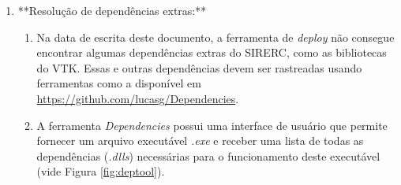 \documentclass[a4paper,11pt]{article}
\newcommand{\sistema}{\textsf{SIRERC}}
\newcommand{\msvc}{\textit{MSVC}}
\begin{document}
\begin{enumerate}
\begin{enumerate}
		\item No terminal \emph{Powershell}, certifique-se de estar no diretório que contém o executável do \sistema{} copiado anteriormente. Execute o comando a seguir, substituindo a variável  pelo caminho onde o Qt está instalado e usando o nome correto do arquivo \emph{.exe}:
		
		\begin{verbatim}
			${QtDirectory}\5.15.2\msvc2015_64\bin\windeployqt.exe Sirerc_Project.exe --compiler-runtime
		\end{verbatim}
		
		\item Aguarde a conclusão do processo de \emph{deploy} e verifique se há uma grande quantidade de novos arquivos e diretórios dentro do diretório  (vide Figura \ref{fig:sirercdeploy}).
		
		\begin{figure}[H]\centering
			\caption{Diretório \emph{win64} após o \emph{deploy}}\label{fig:sirercdeploy}
		\end{figure}
	\end{enumerate}
	
	\item **Resolução de dependências extras:**
	\begin{enumerate}
		\item Na data de escrita deste documento, a ferramenta de \emph{deploy} não consegue encontrar algumas dependências extras do \sistema{}, como as bibliotecas do VTK. Essas e outras dependências devem ser rastreadas usando ferramentas como a disponível em \url{https://github.com/lucasg/Dependencies}.
		\item A ferramenta \emph{Dependencies} possui uma interface de usuário que permite fornecer um arquivo executável \emph{.exe} e receber uma lista de todas as dependências (\emph{.dlls}) necessárias para o funcionamento deste executável (vide Figura \ref{fig:deptool}).
		

\end{enumerate}
\end{enumerate}
\end{document}
